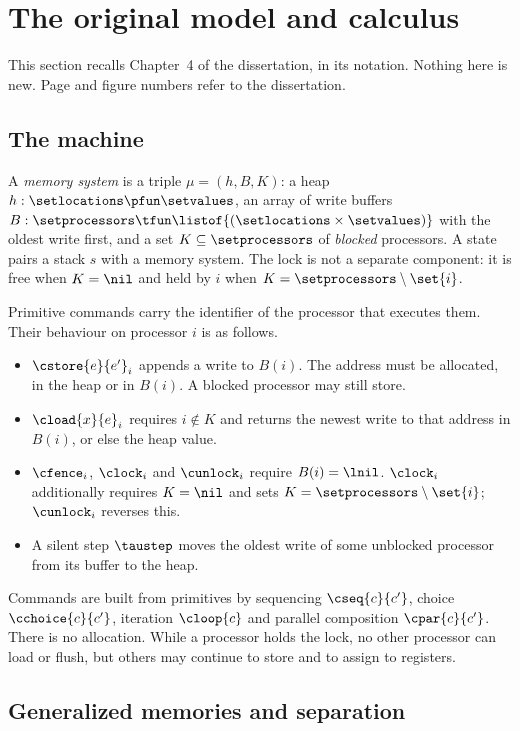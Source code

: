 \section{The original model and calculus}
\label{sec:original}

This section recalls Chapter~4 of the dissertation, in its notation. Nothing
here is new. Page and figure numbers refer to the dissertation.

\subsection{The machine}

A \emph{memory system} is a triple $\mu = (h,B,K)$: a heap
$h : \setlocations \pfun \setvalues$, an array of write buffers
$B : \setprocessors \tfun \listof{(\setlocations \times \setvalues)}$ with
the oldest write first, and a set $K \subseteq \setprocessors$ of
\emph{blocked} processors. A state pairs a stack $s$ with a memory system.
The lock is not a separate component: it is free when $K = \nil$ and held
by $i$ when $K = \setprocessors \setminus \set{i}$.

Primitive commands carry the identifier of the processor that executes
them. Their behaviour on processor $i$ is as follows.
\begin{itemize}[nosep]
  \item $\cstore{e}{e'}_i$ appends a write to $B(i)$. The address must be
        allocated, in the heap or in $B(i)$. A blocked processor may still
        store.
  \item $\cload{x}{e}_i$ requires $i \notin K$ and returns the newest write
        to that address in $B(i)$, or else the heap value.
  \item $\cfence_i$, $\clock_i$ and $\cunlock_i$ require $B(i) = \lnil$.
        $\clock_i$ additionally requires $K = \nil$ and sets
        $K = \setprocessors \setminus \set{i}$; $\cunlock_i$ reverses this.
  \item A silent step $\taustep$ moves the oldest write of some unblocked
        processor from its buffer to the heap.
\end{itemize}
Commands are built from primitives by sequencing $\cseq{c}{c'}$, choice
$\cchoice{c}{c'}$, iteration $\cloop{c}$ and parallel composition
$\cpar{c}{c'}$. There is no allocation. While a processor holds the lock,
no other processor can load or flush, but others may continue to store and
to assign to registers.

\subsection{Generalized memories and separation}

